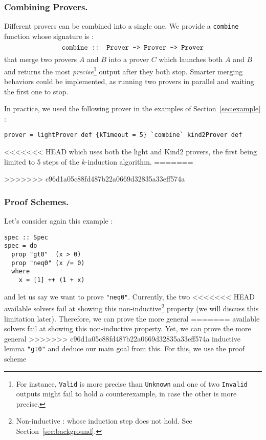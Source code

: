 %


\subsubsection{Combining Provers.}\label{combining-provers}
Different provers can be combined into a single one. We provide a \texttt{combine} function whose signature is : $$\texttt{combine :: Prover -\textgreater{} Prover -\textgreater{} Prover}$$ that merge two provers $A$ and $B$ into a prover $C$ which
launches both $A$ and $B$ and returns the most \emph{precise}\footnote{For instance, \texttt{Valid} is more {precise} than \texttt{Unknown} and one of two \texttt{Invalid} outputs might fail to hold a counterexample, in case the other is more precise.} output after they both stop. Smarter merging behaviors could be implemented, as running two provers in parallel and waiting the first one to stop.

In practice, we used the following prover in the examples of Section~\ref{sec:example} :
\begin{lstlisting}[frame=single]
prover = lightProver def {kTimeout = 5} `combine` kind2Prover def
\end{lstlisting}
<<<<<<< HEAD
which uses both the light and Kind2 provers, the first being limited to 5 steps of the $k$-induction algorithm.
=======

>>>>>>> c96d1a05c88fd487b22a0669d32835a33eff574a

\subsubsection{Proof Schemes.}\label{proof-schemes}

Let's consider again this example :

\begin{lstlisting}[frame=single]
spec :: Spec
spec = do
  prop "gt0"  (x > 0)
  prop "neq0" (x /= 0)
  where
    x = [1] ++ (1 + x)

\end{lstlisting}
and let us say we want to prove \texttt{"neq0"}. Currently, the two
<<<<<<< HEAD
available solvers fail at showing this non-inductive\footnote{Non-inductive : whose induction step does not hold. See Section~\ref{sec:background}.} property (we will
discuss this limitation later). Therefore, we can prove the more general
=======
available solvers fail at showing this non-inductive property.  Yet, we can prove the more general
>>>>>>> c96d1a05c88fd487b22a0669d32835a33eff574a
inductive lemma \texttt{"gt0"} and deduce our main goal from this. For
this, we use the proof scheme

